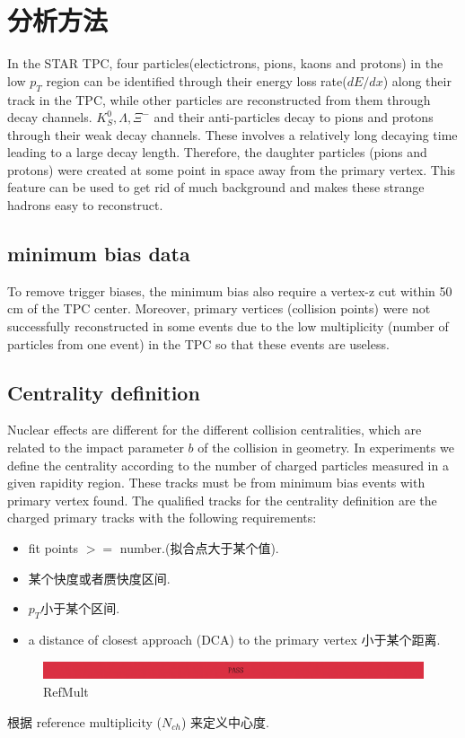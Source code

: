 \section{分析方法}
In the STAR TPC, four particles(electictrons, pions, kaons and protons) in the low $p_{T}$ region can be identified through their energy loss rate($dE/dx$) along their track in the TPC,
while other particles are reconstructed from them through decay channels.
$K^{0}_{S}, \Lambda, \Xi^{-}$ and their anti-particles decay to pions and protons through their weak decay channels.
These involves a relatively long decaying time leading to a large decay length.
Therefore, the daughter particles (pions and protons) were created at some point in space away from the primary vertex.
This feature can be used to get rid of much background and makes these strange hadrons easy to reconstruct.
\subsection{minimum bias data}
To remove trigger biases, the minimum bias also require a vertex-z cut within 50 cm of the TPC center.
Moreover, primary vertices (collision points) were not successfully reconstructed in some events due to the low multiplicity (number of particles from one event) in the TPC so that these events are useless.
\subsection{Centrality definition}
Nuclear effects are different for the different collision centralities,
which are related to the impact parameter $b$ of the collision in geometry.
In experiments we define the centrality according to the number of charged particles measured in a given rapidity region.
These tracks must be from minimum bias events with primary vertex found.
The qualified tracks for the centrality definition are the charged primary tracks with the following requirements:
\begin{itemize}
\item{fit points $>=$ number.(拟合点大于某个值).}
\item{某个快度或者赝快度区间.}
\item{$p_{T}$小于某个区间.}
\item{a distance of closest approach {\color{red}(DCA)} to the primary vertex 小于某个距离.}
\end{itemize}
\begin{figure}[htpb]
  \centering
  \includegraphics[width=\linewidth]{pictures/pass.pdf}
  \caption{RefMult}
  \label{fig:RefMult}
\end{figure}
根据 reference multiplicity ($N_{ch}$) 来定义中心度.

